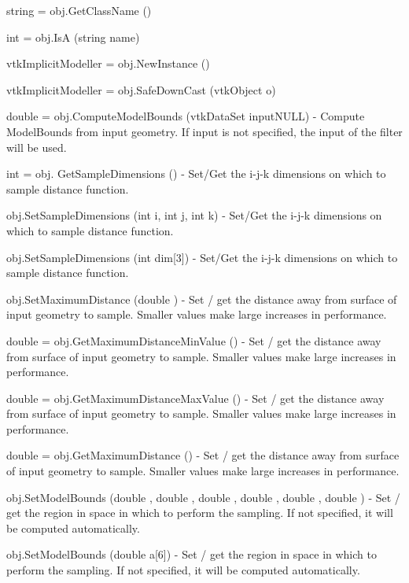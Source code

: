 \begin{DoxyItemize}
\item {\ttfamily string = obj.\-Get\-Class\-Name ()}  
\item {\ttfamily int = obj.\-Is\-A (string name)}  
\item {\ttfamily vtk\-Implicit\-Modeller = obj.\-New\-Instance ()}  
\item {\ttfamily vtk\-Implicit\-Modeller = obj.\-Safe\-Down\-Cast (vtk\-Object o)}  
\item {\ttfamily double = obj.\-Compute\-Model\-Bounds (vtk\-Data\-Set input\-N\-U\-L\-L)} -\/ Compute Model\-Bounds from input geometry. If input is not specified, the input of the filter will be used.  
\item {\ttfamily int = obj. Get\-Sample\-Dimensions ()} -\/ Set/\-Get the i-\/j-\/k dimensions on which to sample distance function.  
\item {\ttfamily obj.\-Set\-Sample\-Dimensions (int i, int j, int k)} -\/ Set/\-Get the i-\/j-\/k dimensions on which to sample distance function.  
\item {\ttfamily obj.\-Set\-Sample\-Dimensions (int dim\mbox{[}3\mbox{]})} -\/ Set/\-Get the i-\/j-\/k dimensions on which to sample distance function.  
\item {\ttfamily obj.\-Set\-Maximum\-Distance (double )} -\/ Set / get the distance away from surface of input geometry to sample. Smaller values make large increases in performance.  
\item {\ttfamily double = obj.\-Get\-Maximum\-Distance\-Min\-Value ()} -\/ Set / get the distance away from surface of input geometry to sample. Smaller values make large increases in performance.  
\item {\ttfamily double = obj.\-Get\-Maximum\-Distance\-Max\-Value ()} -\/ Set / get the distance away from surface of input geometry to sample. Smaller values make large increases in performance.  
\item {\ttfamily double = obj.\-Get\-Maximum\-Distance ()} -\/ Set / get the distance away from surface of input geometry to sample. Smaller values make large increases in performance.  
\item {\ttfamily obj.\-Set\-Model\-Bounds (double , double , double , double , double , double )} -\/ Set / get the region in space in which to perform the sampling. If not specified, it will be computed automatically.  
\item {\ttfamily obj.\-Set\-Model\-Bounds (double a\mbox{[}6\mbox{]})} -\/ Set / get the region in space in which to perform the sampling. If not specified, it will be computed automatically.  

\end{DoxyItemize}
